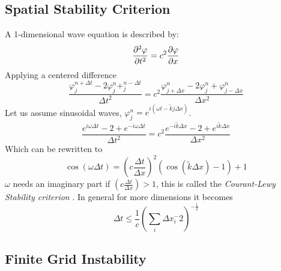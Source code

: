     \subsection{Spatial Stability Criterion}
        A 1-dimensional wave equation is described by:
        \begin{equation}
                \pdv[2]{\varphi}{t} = c^2 \pdv{\varphi}{x}
        \end{equation}
        Applying a centered difference
        \begin{equation}
            \frac{\varphi^{n + \Delta t}_{j} - 2 \varphi^{n}_{j} + ^{n - \Delta t}_{j}}{\Delta t^2}
            =
            c^2\frac{\varphi^n_{j+\Delta x} - 2\varphi^n_{j} + \varphi^n_{j-\Delta x}}{\Delta x^2}
        \end{equation}
        Let us assume sinusoidal waves, \(\varphi^n_j = e^{i(\omega t  - \tilde{k}j\Delta x)}\).
        \begin{equation}
            \frac{e^{i\omega \Delta t} - 2 +e^{-i\omega \Delta t} }{\Delta t^2}
            = c^2 \frac{e^{-i\tilde k \Delta x} - 2 + e^{i\tilde k \Delta x}}{\Delta x ^2}
        \end{equation}
        Which can be rewritten to
        \begin{equation}
            \cos(\omega \Delta t) = \left(c\frac{\Delta t}{\Delta x}\right)^2\left(\cos(\tilde k \Delta x) - 1 \right) + 1
        \end{equation}
        \(\omega\) needs an imaginary part if \( \left(c\frac{\Delta t}{\Delta x}\right)>1\), this is called the \textit{Courant-Lewy Stability criterion}
        \citep{courant_uber_1869}. In general for more dimensions it becomes
        \begin{equation}
            \Delta t \leq \frac{1}{c} \left(\sum_i\Delta x_i^-2\right)^{-\frac{1}{2}}
        \end{equation}

    \subsection{Finite Grid Instability}
        \label{sec:finite_grid_instability}
